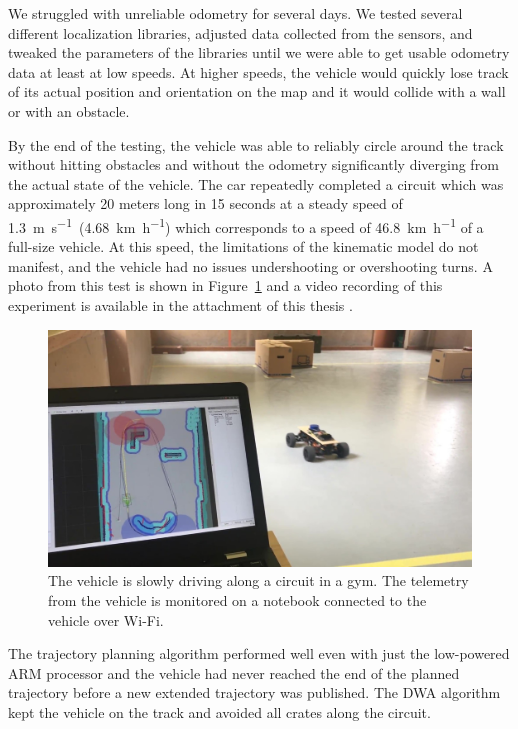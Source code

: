 We struggled with unreliable odometry for several days. We tested several different localization libraries, adjusted data collected from the sensors, and tweaked the parameters of the libraries until we were able to get usable odometry data at least at low speeds. At higher speeds, the vehicle would quickly lose track of its actual position and orientation on the map and it would collide with a wall or with an obstacle.

By the end of the testing, the vehicle was able to reliably circle around the track without hitting obstacles and without the odometry significantly diverging from the actual state of the vehicle. The car repeatedly completed a circuit which was approximately 20 meters long in 15 seconds at a steady speed of \SI{1.3}{\meter\per\second}~(\SI{4.68}{\kilo\meter\per\hour}) which corresponds to a speed of \SI{46.8}{\kilo\meter\per\hour} of a full-size vehicle. At this speed, the limitations of the kinematic model do not manifest, and the vehicle had no issues undershooting or overshooting turns. A photo from this test is shown in Figure~\ref{fig:real-world-testing-driving} and a video recording of this experiment is available in the attachment of this thesis .

\begin{figure}
	\label{fig:real-world-testing-driving}
	\centering
	\includegraphics[width=\textwidth]{../img/experiments/real-world-driving.jpg}
	\caption{The vehicle is slowly driving along a circuit in a gym. The telemetry from the vehicle is monitored on a notebook connected to the vehicle over Wi-Fi.}
\end{figure}

The trajectory planning algorithm performed well even with just the low-powered ARM processor and the vehicle had never reached the end of the planned trajectory before a new extended trajectory was published. The \gls{DWA} algorithm kept the vehicle on the track and avoided all crates along the circuit.

